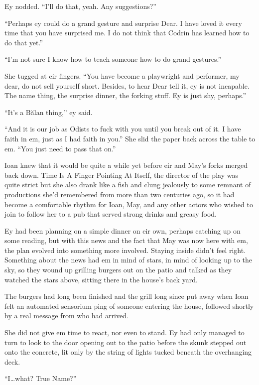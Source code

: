 Ey nodded. ``I'll do that, yeah. Any suggestions?''

``Perhaps ey could do a grand gesture and surprise Dear. I have loved it every time that you have surprised me. I do not think that Codrin has learned how to do that yet.''

``I'm not sure I know how to teach someone how to do grand gestures.''

She tugged at eir fingers. ``You have become a playwright and performer, my dear, do not sell yourself short. Besides, to hear Dear tell it, ey is not incapable. The name thing, the surprise dinner, the forking stuff. Ey is just shy, perhaps.''

``It's a Bălan thing,'' ey said.

``And it is our job as Odists to fuck with you until you break out of it. I have faith in em, just as I had faith in you.'' She slid the paper back across the table to em. ``You just need to pass that on.''

Ioan knew that it would be quite a while yet before eir and May's forks merged back down. Time Is A Finger Pointing At Itself, the director of the play was quite strict but she also drank like a fish and clung jealously to some remnant of productions she'd remembered from more than two centuries ago, so it had become a comfortable rhythm for Ioan, May, and any other actors who wished to join to follow her to a pub that served strong drinks and greasy food.

Ey had been planning on a simple dinner on eir own, perhaps catching up on some reading, but with this news and the fact that May was now here with em, the plan evolved into something more involved. Staying inside didn't feel right. Something about the news had em in mind of stars, in mind of looking up to the sky, so they wound up grilling burgers out on the patio and talked as they watched the stars above, sitting there in the house's back yard.

The burgers had long been finished and the grill long since put away when Ioan felt an automated sensorium ping of someone entering the house, followed shortly by a real message from who had arrived.

She did not give em time to react, nor even to stand. Ey had only managed to turn to look to the door opening out to the patio before the skunk stepped out onto the concrete, lit only by the string of lights tucked beneath the overhanging deck.

``I\ldots what? True Name?''

